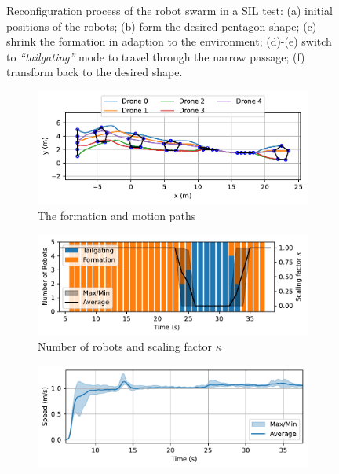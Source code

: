 \begin{figure}
\begin{subfigure}[b]{0.325\textwidth}
    \caption{}
    \end{subfigure}
    \caption{Reconfiguration process of the robot swarm in a SIL test: (a) initial positions of the robots; (b) form the desired pentagon shape; (c) shrink the formation in adaption to the environment; (d)-(e) switch to \textit{``tailgating''} mode to travel through the narrow passage; (f) transform back to the desired shape.}
    \label{fig:snap}
\end{figure}

\begin{figure}
    \centering
    \begin{subfigure}[b]{0.48\textwidth}
    \includegraphics[width=\textwidth]{paper3/images/gazebo_path.pdf}
    \caption{The formation and motion paths}
    \label{fig:gazebo_path}
    \end{subfigure}
    \begin{subfigure}[b]{0.48\textwidth}
    \includegraphics[width=\textwidth]{paper3/images/gazebo_correlation.pdf}
    \caption{Number of robots and scaling factor $\kappa$}
    \label{fig:gazebo_mode}
    \end{subfigure}
    \begin{subfigure}[b]{0.48\textwidth}
    \includegraphics[width=\textwidth]{paper3/images/gazebo_speed.pdf}

\end{subfigure}
\end{figure}
